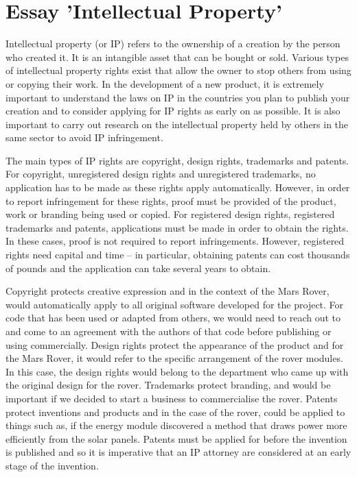 \documentclass[10pt,twoside]{article}
\begin{document}
\newpage
\section{Essay 'Intellectual Property'}

Intellectual property (or IP) refers to the ownership of a creation by the person who created it. \cite{WhatProperty} It is an intangible asset that can be bought or sold. Various types of intellectual property rights exist that allow the owner to stop others from using or copying their work. In the development of a new product, it is extremely important to understand the laws on IP in the countries you plan to publish your creation and to consider applying for IP rights as early on as possible. It is also important to carry out research on the intellectual property held by others in the same sector to avoid  IP infringement.

The main types of IP rights are copyright, design rights, trademarks and patents. \cite{IntellectualGOV.UK} For copyright, unregistered design rights and unregistered trademarks, no application has to be made as these rights apply automatically. However, in order to report infringement for these rights, proof must be provided of the product, work or branding being used or copied. For registered design rights, registered trademarks and patents, applications must be made in order to obtain the rights. In these cases, proof is not required to report infringements. However, registered rights need capital and time – in particular, obtaining patents can cost thousands of pounds and the application can take several years to obtain.  

Copyright protects creative expression and in the context of the Mars Rover, would automatically apply to all original software developed for the project. For code that has been used or adapted from others, we would need to reach out to and come to an agreement with the authors of that code before publishing or using commercially. Design rights protect the appearance of the product and for the Mars Rover, it would refer to the specific arrangement of the rover modules. In this case, the design rights would belong to the department who came up with the original design for the rover. Trademarks protect branding, and would be important if we decided to start a business to commercialise the rover. Patents protect inventions and products and in the case of the rover, could be applied to things such as, if the energy module discovered a method that draws power more efficiently from the solar panels. Patents must be applied for before the invention is published and so it is imperative that an IP attorney are considered at an early stage of the invention. 
\end{document}
